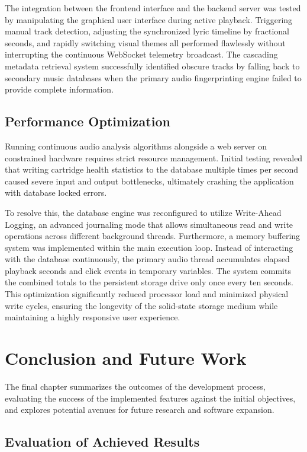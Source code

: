 \documentclass[12pt,a4paper,english]{report}
\begin{document}
The integration between the frontend interface and the backend server was tested by manipulating the graphical user interface during active playback. Triggering manual track detection, adjusting the synchronized lyric timeline by fractional seconds, and rapidly switching visual themes all performed flawlessly without interrupting the continuous WebSocket telemetry broadcast. The cascading metadata retrieval system successfully identified obscure tracks by falling back to secondary music databases when the primary audio fingerprinting engine failed to provide complete information.

\section{Performance Optimization}

Running continuous audio analysis algorithms alongside a web server on constrained hardware requires strict resource management. Initial testing revealed that writing cartridge health statistics to the database multiple times per second caused severe input and output bottlenecks, ultimately crashing the application with database locked errors. 

To resolve this, the database engine was reconfigured to utilize Write-Ahead Logging, an advanced journaling mode that allows simultaneous read and write operations across different background threads. Furthermore, a memory buffering system was implemented within the main execution loop. Instead of interacting with the database continuously, the primary audio thread accumulates elapsed playback seconds and click events in temporary variables. The system commits the combined totals to the persistent storage drive only once every ten seconds. This optimization significantly reduced processor load and minimized physical write cycles, ensuring the longevity of the solid-state storage medium while maintaining a highly responsive user experience.

\chapter{Conclusion and Future Work}

The final chapter summarizes the outcomes of the development process, evaluating the success of the implemented features against the initial objectives, and explores potential avenues for future research and software expansion.

\section{Evaluation of Achieved Results}
\end{document}
